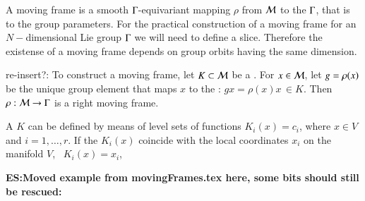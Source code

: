 A moving frame is a smooth
$\Gamma$-equivariant mapping $\rho$ from $\mathcal{M}$ to the
$\Gamma$, that is to the group parameters.  For the practical
construction of a moving frame for an $N-$dimensional Lie group
$\Gamma$ we will need to define a slice.
Therefore the existense of a moving frame depends on
group orbits having the same dimension.

re-insert?: To construct a moving frame, let $K\subset\mathcal{M}$ be a {\csection}. For $x\in \mathcal{M}$, let
$g=\rho(x)$ be the unique group element that maps $x$
to the {\csection}: $g x = \rho(x) x\, \in K$. Then
$\rho:\mathcal{M}\rightarrow \Gamma$ is a right moving frame.

A {\csection} $K$ can be defined by means of level sets of
functions $K_i(x)=c_i$, where $x\in V$ and $i=1,\ldots,r$. If
the $K_i(x)$ coincide with the local coordinates $x_i$ on the
manifold $V$, \ie~$K_i(x)=x_i$, 

{\bf ES:Moved example from movingFrames.tex here, some bits should still be rescued:}


